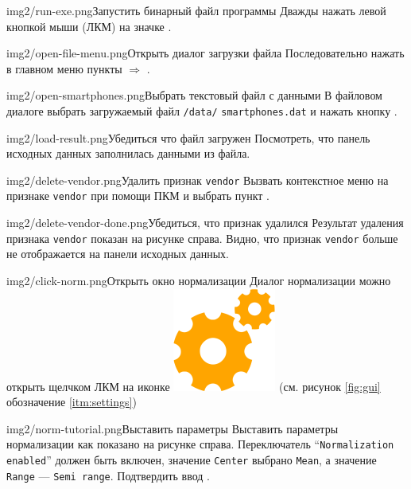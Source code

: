 \documentclass[12pt,tikz]{instruction}
\begin{document}
\begin{steps}
	\begin{ist}{img2/run-exe.png}{Запустить бинарный файл программы}		
		Дважды нажать левой кнопкой мыши (ЛКМ) на значке \ExeFile. 
	\end{ist}
	\begin{ist}{img2/open-file-menu.png}{Открыть диалог загрузки файла}		
		Последовательно нажать в главном меню пункты  $ \Rightarrow $ .
	\end{ist}
	\begin{ist}{img2/open-smartphones.png}{Выбрать текстовый файл с данными}
		В файловом диалоге выбрать загружаемый файл \texttt{\SysName /data/} \texttt{smartphones.dat} и нажать кнопку .
	\end{ist}
	\begin{ist}{img2/load-result.png}{Убедиться что файл загружен}
		Посмотреть, что панель исходных данных заполнилась данными из файла.		
	\end{ist}
	\begin{ist}{img2/delete-vendor.png}{Удалить признак \texttt{vendor}}
		Вызвать контекстное меню на признаке \texttt{vendor} при помощи ПКМ и выбрать пункт .
	\end{ist}
	\begin{ist}{img2/delete-vendor-done.png}{Убедиться, что признак удалился}
		Результат удаления признака \texttt{vendor} показан на рисунке справа. Видно, что признак \texttt{vendor} больше не отображается на панели исходных данных. 
	\end{ist}	
	\begin{ist}{img2/click-norm.png}{Открыть окно нормализации}
		Диалог нормализации можно открыть щелчком ЛКМ на иконке \includegraphics[scale=0.1]{img2/settings.png} (см. рисунок \ref{fig:gui} обозначение \ref{itm:settings})
	\end{ist}
	\begin{ist}{img2/norm-tutorial.png}{Выставить параметры}
		Выставить параметры нормализации как показано на рисунке справа. Переключатель ``\texttt{Normalization enabled}'' должен быть включен, значение \texttt{Center} выбрано \texttt{Mean}, а значение \texttt{Range} --- \texttt{Semi range}. Подтвердить ввод . 

\end{ist}
\end{steps}
\end{document}
